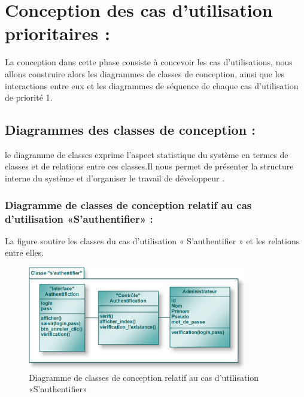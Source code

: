 \documentclass[12 pt ]{report}
\begin{document}
\section{Conception des cas d’utilisation prioritaires :}
La conception dans cette phase consiste à concevoir les cas d’utilisations, nous allons construire alors les diagrammes de classes de conception, ainsi que les interactions entre eux et les diagrammes de séquence de chaque cas d’utilisation de priorité 1.
\subsection{Diagrammes des classes de conception :}
le diagramme de classes exprime l'aspect statistique du système en termes de classes et de relations entre ces classes.Il nous permet de présenter la structure interne du système et d'organiser le travail de développeur .
\newpage
\subsubsection{Diagramme de classes de conception relatif au cas d’utilisation «S’authentifier» :}
La figure  soutire les classes du cas d’utilisation « S’authentifier » et les relations entre elles.
\begin{figure}[h]
 \begin{center}
\includegraphics[width= 12 cm ,height=  4.5cm]{cl_auth.PNG}
\caption{Diagramme de classes de conception relatif au cas d’utilisation «S’authentifier» }

\end{center}
\end{figure}
\end{document}
